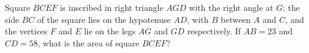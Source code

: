 Square $BCEF$ is inscribed in right triangle $AGD$ with the right angle at $G$: the side $BC$ of the square lies on the hypotenuse $AD$, with $B$ between $A$ and $C$, and the vertices $F$ and $E$ lie on the legs $AG$ and $GD$ respectively. If $AB=23$ and $CD=58$, what is the area of square $BCEF$?
